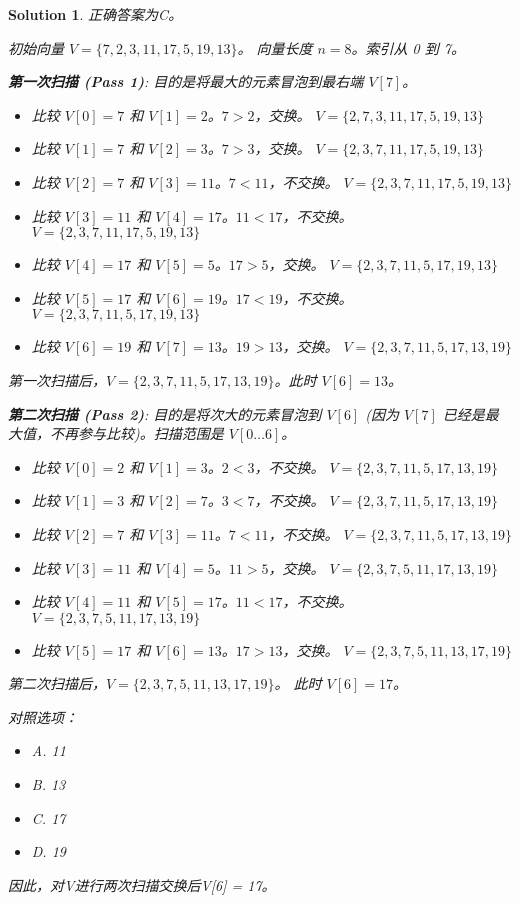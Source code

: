 \documentclass[UTF8]{report}
\newtheorem{solution}{Solution}
\theoremstyle{MyLineTheoremStyle} %
\theoremstyle{MyBlockTheoremStyle} %
\theoremstyle{MySubsubsectionStyle} %
\begin{document}
\begin{solution}
正确答案为C。

初始向量 $V = \{7, 2, 3, 11, 17, 5, 19, 13\}$。
向量长度 $n=8$。索引从 0 到 7。

\textbf{第一次扫描 (Pass 1)}:
目的是将最大的元素冒泡到最右端 $V[7]$。
\begin{itemize}
    \item 比较 $V[0]=7$ 和 $V[1]=2$。$7 > 2$，交换。 $V = \{2, 7, 3, 11, 17, 5, 19, 13\}$
    \item 比较 $V[1]=7$ 和 $V[2]=3$。$7 > 3$，交换。 $V = \{2, 3, 7, 11, 17, 5, 19, 13\}$
    \item 比较 $V[2]=7$ 和 $V[3]=11$。$7 < 11$，不交换。 $V = \{2, 3, 7, 11, 17, 5, 19, 13\}$
    \item 比较 $V[3]=11$ 和 $V[4]=17$。$11 < 17$，不交换。 $V = \{2, 3, 7, 11, 17, 5, 19, 13\}$
    \item 比较 $V[4]=17$ 和 $V[5]=5$。$17 > 5$，交换。 $V = \{2, 3, 7, 11, 5, 17, 19, 13\}$
    \item 比较 $V[5]=17$ 和 $V[6]=19$。$17 < 19$，不交换。 $V = \{2, 3, 7, 11, 5, 17, 19, 13\}$
    \item 比较 $V[6]=19$ 和 $V[7]=13$。$19 > 13$，交换。 $V = \{2, 3, 7, 11, 5, 17, 13, 19\}$
\end{itemize}
第一次扫描后，$V = \{2, 3, 7, 11, 5, 17, 13, 19\}$。此时 $V[6]=13$。

\textbf{第二次扫描 (Pass 2)}:
目的是将次大的元素冒泡到 $V[6]$ (因为 $V[7]$ 已经是最大值，不再参与比较)。扫描范围是 $V[0 \dots 6]$。
\begin{itemize}
    \item 比较 $V[0]=2$ 和 $V[1]=3$。$2 < 3$，不交换。 $V = \{2, 3, 7, 11, 5, 17, 13, 19\}$
    \item 比较 $V[1]=3$ 和 $V[2]=7$。$3 < 7$，不交换。 $V = \{2, 3, 7, 11, 5, 17, 13, 19\}$
    \item 比较 $V[2]=7$ 和 $V[3]=11$。$7 < 11$，不交换。 $V = \{2, 3, 7, 11, 5, 17, 13, 19\}$
    \item 比较 $V[3]=11$ 和 $V[4]=5$。$11 > 5$，交换。 $V = \{2, 3, 7, 5, 11, 17, 13, 19\}$
    \item 比较 $V[4]=11$ 和 $V[5]=17$。$11 < 17$，不交换。 $V = \{2, 3, 7, 5, 11, 17, 13, 19\}$
    \item 比较 $V[5]=17$ 和 $V[6]=13$。$17 > 13$，交换。 $V = \{2, 3, 7, 5, 11, 13, 17, 19\}$
\end{itemize}
第二次扫描后，$V = \{2, 3, 7, 5, 11, 13, 17, 19\}$。
此时 $V[6]=17$。

对照选项：
\begin{itemize}
    \item A. 11
    \item B. 13
    \item C. 17
    \item D. 19
\end{itemize}
因此，对V进行两次扫描交换后V[6] = 17。
\end{solution}
\end{document}
